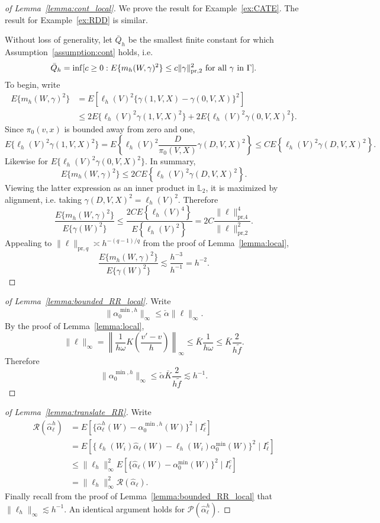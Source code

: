 \begin{proof}[of Lemma~\ref{lemma:cont_local}]
We prove the result for Example~\ref{ex:CATE}. The result for Example~\ref{ex:RDD} is similar.

Without loss of generality, let $\bar{Q}_h$ be the smallest finite constant for which Assumption~\ref{assumption:cont} holds, i.e.
$$
\bar{Q}_h=\inf [c\geq 0: E\{m_h(W,\gamma)^2\}\leq c \|\gamma\|^2_{\text{\normalfont pr,2}} \text{ for all } \gamma \text{ in }\Gamma ].
$$
To begin, write
\begin{align*}
    E\{m_h(W,\gamma)^2\}&=E[\ell_h(V)^2\{\gamma(1,V,X)-\gamma(0,V,X)\}^2] \\
    &\leq 2 E\{\ell_h(V)^2\gamma(1,V,X)^2\}+2E\{\ell_h(V)^2\gamma(0,V,X)^2\}.
\end{align*}
Since $\pi_0(v,x)$ is bounded away from zero and one,
$$
E\{\ell_h(V)^2\gamma(1,V,X)^2\}=E\left\{\ell_h(V)^2 \frac{D}{\pi_0(V,X)}\gamma(D,V,X)^2\right\} \leq C E\left\{\ell_h(V)^2 \gamma(D,V,X)^2\right\}.
$$
Likewise for $E\{\ell_h(V)^2\gamma(0,V,X)^2\}$. In summary,
$$
E\{m_h(W,\gamma)^2\} \leq 2C E\left\{\ell_h(V)^2 \gamma(D,V,X)^2\right\}.
$$
Viewing the latter expression as an inner product in $\mathbb{L}_2$, it is maximized by alignment, i.e. taking 
$
\gamma(D,V,X)^2=\ell_h(V)^2.
$
Therefore
$$
\frac{E\{m_h(W,\gamma)^2\}}{E\{\gamma(W)^2\}} \leq \frac{2C E\left\{\ell_h(V)^4\right\}}{E\left\{\ell_h(V)^2\right\}}=2C \frac{\|\ell\|^4_{\text{pr,4}}}{\|\ell\|^2_{\text{pr,2}}}.
$$
Appealing to $\|\ell\|_{\text{pr},q}\asymp h^{-(q-1)/q}$ from the proof of Lemma~\ref{lemma:local},
$$
\frac{E\{m_h(W,\gamma)^2\}}{E\{\gamma(W)^2\}}\lesssim \frac{h^{-3}}{h^{-1}}=h^{-2}.
$$
\end{proof}

\begin{proof}[of Lemma~\ref{lemma:bounded_RR_local}]
Write
$$
\|\alpha_0^{\min,h}\|_{\infty}\leq \check{\alpha}\|\ell\|_{\infty}.
$$
By the proof of Lemma~\ref{lemma:local},
$$
\|\ell\|_{\infty}=\left\| \frac{1}{h\omega}K\left(\frac{v'-v}{h}\right) \right\|_{\infty}\leq \bar{K}\frac{1}{h\omega}\leq \bar{K}\frac{2}{h \tilde{f}}.
$$
Therefore
$$
\|\alpha_0^{\min,h}\|_{\infty}\leq \check{\alpha}\bar{K}\frac{2}{h \tilde{f}}\lesssim h^{-1}.
$$
\end{proof}

\begin{proof}[of Lemma~\ref{lemma:translate_RR}]
Write
\begin{align*}
    \mathcal{R}(\hat{\alpha}^h_{\ell})
    &=E[\{\hat{\alpha}^h_{\ell}(W)-\alpha^{\min,h}_0(W)\}^2\mid I^c_{\ell}] \\
    &=E[\{\ell_h(W_i)\hat{\alpha}_{\ell}(W)-\ell_h(W_i)\alpha^{\min}_0(W)\}^2\mid I^c_{\ell}] \\
    &\leq \|\ell_h\|^2_{\infty} E[\{\hat{\alpha}_{\ell}(W)-\alpha^{\min}_0(W)\}^2\mid I^c_{\ell}] \\
    &=\|\ell_h\|^2_{\infty} \mathcal{R}(\hat{\alpha}_{\ell}).
\end{align*}
Finally recall from the proof of Lemma~\ref{lemma:bounded_RR_local} that $\|\ell_h\|_{\infty}\lesssim h^{-1}$. An identical argument holds for $ \mathcal{P}(\hat{\alpha}^h_{\ell})$.
\end{proof}


